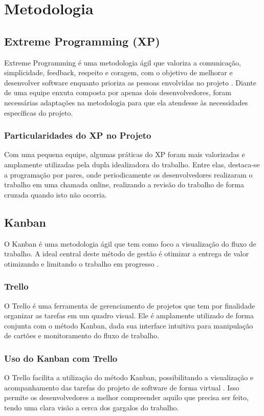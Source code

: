\chapter[Metodologia]{Metodologia}

\section{Extreme Programming (XP)}
Extreme Programming é uma metodologia ágil que valoriza a comunicação, simplicidade, feedback, respeito e coragem, com o objetivo de melhorar e desenvolver software enquanto prioriza as pessoas envolvidas no projeto \cite{extremeprogramming}. Diante de uma equipe enxuta composta por apenas dois desenvolvedores, foram necessárias adaptações na metodologia para que ela atendesse às necessidades específicas do projeto.

\subsection{Particularidades do XP no Projeto}
Com uma pequena equipe, algumas práticas do XP foram mais valorizadas e amplamente utilizadas pela dupla idealizadora do trabalho. Entre elas, destaca-se a programação por pares, onde periodicamente os desenvolvedores realizaram o trabalho em uma chamada online, realizando a revisão do trabalho de forma cruzada quando isto não ocorria.


\section{Kanban}
O Kanban é uma metodologia ágil que tem como foco a visualização do fluxo de trabalho. A ideal central deste método de gestão é otimizar a entrega de valor otimizando e limitando o trabalho em progresso \cite{kanban2025}.

\subsection{Trello}
O Trello é uma ferramenta de gerenciamento de projetos que tem por finalidade organizar as tarefas em um quadro visual. Ele é amplamente utilizado de forma conjunta com o método Kanban, dada sua interface intuitiva para manipulação de cartões e monitoramento do fluxo de trabalho.

\subsection{Uso do Kanban com Trello}
O Trello facilita a utilização do método Kanban, possibilitando a visualização e acompanhamento das tarefas do projeto de software de forma virtual \cite{campos2023trello}. Isso permite os desenvolvedores a melhor compreender aquilo que precisa ser feito, tendo uma clara visão a cerca dos gargalos do trabalho.

